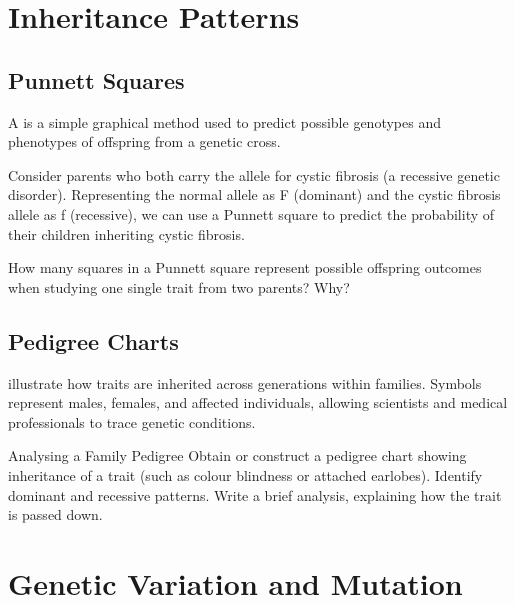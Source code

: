 \section{Inheritance Patterns}

\subsection{Punnett Squares}

A  is a simple graphical method used to predict possible genotypes and phenotypes of offspring from a genetic cross.

\begin{example}
Consider parents who both carry the allele for cystic fibrosis (a recessive genetic disorder). Representing the normal allele as F (dominant) and the cystic fibrosis allele as f (recessive), we can use a Punnett square to predict the probability of their children inheriting cystic fibrosis.
\end{example}


\begin{stopandthink}
How many squares in a Punnett square represent possible offspring outcomes when studying one single trait from two parents? Why?
\end{stopandthink}

\subsection{Pedigree Charts}

 illustrate how traits are inherited across generations within families. Symbols represent males, females, and affected individuals, allowing scientists and medical professionals to trace genetic conditions.

\begin{investigation}{Analysing a Family Pedigree}
Obtain or construct a pedigree chart showing inheritance of a trait (such as colour blindness or attached earlobes). Identify dominant and recessive patterns. Write a brief analysis, explaining how the trait is passed down.
\end{investigation}

\section{Genetic Variation and Mutation}

